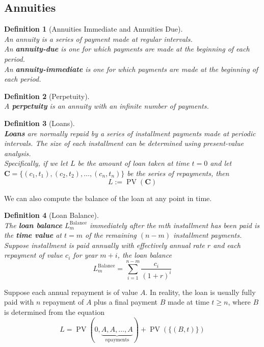 \documentclass[11pt]{article}
\newtheorem{definition}{Definition}[section]
\theoremstyle{definition}
\DeclareMathOperator{\PV}{PV}
\newcommand\cf[1]{\mathbf{#1}}
\begin{document}
\subsection{Annuities}
\begin{definition}[Annuities Immediate and Annuities Due]
\hfill\\\normalfont An annuity is a series of payment made at regular intervals.\\
An \textbf{annuity-due} is one for which payments are made at the \textit{beginning} of each period.\\
An \textbf{annuity-immediate} is one for which payments are made at the \textit{beginning} of each period.
\end{definition}
\begin{definition}[Perpetuity]
\hfill\\\normalfont A \textbf{perpetuity} is an annuity with an infinite number of payments.
\end{definition}
\begin{definition}[Loans]
\hfill\\\normalfont \textbf{Loans} are normally repaid by a series of installment payments made at \textit{periodic} intervals. The size of each installment can be determined using present-value analysis.\\
Specifically, if we let $L$ be the amount of loan taken at time $t=0$ and let $\cf{C} =\{(c_1,t_1),(c_2,t_2),\ldots,(c_n,t_n)\}$ be the series of repayments, then
\[
L :=\PV(\cf{C})
\]
\end{definition}
We can also compute the balance of the loan at any point in time.\\
\begin{definition}[Loan Balance]
\hfill\\\normalfont
The \textbf{loan balance} $L_m^{\text{Balance}}$ immediately after the $m$th installment has been paid is the \textbf{time value} at $t = m$ of the remaining $(n-m)$ installment payments.\\
Suppose installment is paid annually with effectively annual rate $r$ and each repayment of value $c_i$ for year $m+i$, the loan balance
\[
L_m^\text{Balance} = \sum_{i = 1}^{n-m} \frac{c_i}{(1+r)^i}
\]
\end{definition}
Suppose each annual repayment is of value $A$. In reality, the loan is usually fully paid with $n$ repayment of $A$ plus a final payment $B$ made at time $t\geq n$, where $B$ is determined from the equation
\[
L=\PV(0,\underbrace{A,A,\ldots,A}_{n \text{payments}})+\PV(\{(B,t)\})
\]
\end{document}
